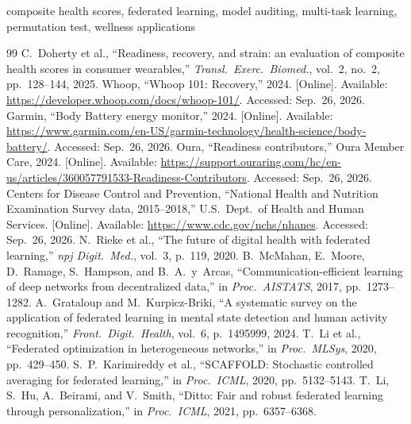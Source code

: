 \documentclass[conference]{IEEEtran}
\begin{document}
\begin{IEEEkeywords}
composite health scores, federated learning, model auditing, multi-task learning, permutation test, wellness applications
\end{IEEEkeywords}








\begin{thebibliography}{99}
 C.~Doherty et al., ``Readiness, recovery, and strain: an evaluation of composite health scores in consumer wearables,'' \emph{Transl.\ Exerc.\ Biomed.}, vol.~2, no.~2, pp.~128--144, 2025.
 Whoop, ``Whoop 101: Recovery,'' 2024. [Online]. Available: \url{https://developer.whoop.com/docs/whoop-101/}. Accessed: Sep.~26, 2026.
 Garmin, ``Body Battery energy monitor,'' 2024. [Online]. Available: \url{https://www.garmin.com/en-US/garmin-technology/health-science/body-battery/}. Accessed: Sep.~26, 2026.
 Oura, ``Readiness contributors,'' Oura Member Care, 2024. [Online]. Available: \url{https://support.ouraring.com/hc/en-us/articles/360057791533-Readiness-Contributors}. Accessed: Sep.~26, 2026.
 Centers for Disease Control and Prevention, ``National Health and Nutrition Examination Survey data, 2015--2018,'' U.S.\ Dept.\ of Health and Human Services. [Online]. Available: \url{https://www.cdc.gov/nchs/nhanes}. Accessed: Sep.~26, 2026.
 N.~Rieke et al., ``The future of digital health with federated learning,'' \emph{npj Digit.\ Med.}, vol.~3, p.~119, 2020.
 B.~McMahan, E.~Moore, D.~Ramage, S.~Hampson, and B.~A.~y~Arcas, ``Communication-efficient learning of deep networks from decentralized data,'' in \emph{Proc.\ AISTATS}, 2017, pp.~1273--1282.
 A.~Grataloup and M.~Kurpicz-Briki, ``A systematic survey on the application of federated learning in mental state detection and human activity recognition,'' \emph{Front.\ Digit.\ Health}, vol.~6, p.~1495999, 2024.
 T.~Li et al., ``Federated optimization in heterogeneous networks,'' in \emph{Proc.\ MLSys}, 2020, pp.~429--450.
 S.~P.~Karimireddy et al., ``SCAFFOLD: Stochastic controlled averaging for federated learning,'' in \emph{Proc.\ ICML}, 2020, pp.~5132--5143.
 T.~Li, S.~Hu, A.~Beirami, and V.~Smith, ``Ditto: Fair and robust federated learning through personalization,'' in \emph{Proc.\ ICML}, 2021, pp.~6357--6368.

\end{thebibliography}
\end{document}
